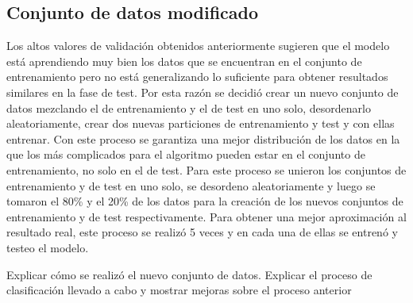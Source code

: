 \subsection{Conjunto de datos modificado}
Los altos valores de validación obtenidos anteriormente sugieren que el modelo está aprendiendo muy bien los datos que se encuentran en el conjunto de entrenamiento pero no está generalizando lo suficiente para obtener resultados similares en la fase de test. Por esta razón se decidió crear un nuevo conjunto de datos mezclando el de entrenamiento y el de test en uno solo, desordenarlo aleatoriamente, crear dos nuevas particiones de entrenamiento y test y con ellas entrenar. Con este proceso se garantiza una mejor distribución de los datos en la que los más complicados para el algoritmo pueden estar en el conjunto de entrenamiento, no solo en el de test.
Para este proceso se unieron los conjuntos de entrenamiento y de test en uno solo, se desordeno aleatoriamente y luego se tomaron el 80\% y el 20\% de los datos para la creación de los nuevos conjuntos de entrenamiento y de test respectivamente. Para obtener una mejor aproximación al resultado real, este proceso se realizó 5 veces y en cada una de ellas se entrenó y testeo el modelo.

Explicar cómo se realizó el nuevo conjunto de datos. Explicar el proceso de clasificación llevado a cabo y mostrar mejoras sobre el proceso anterior